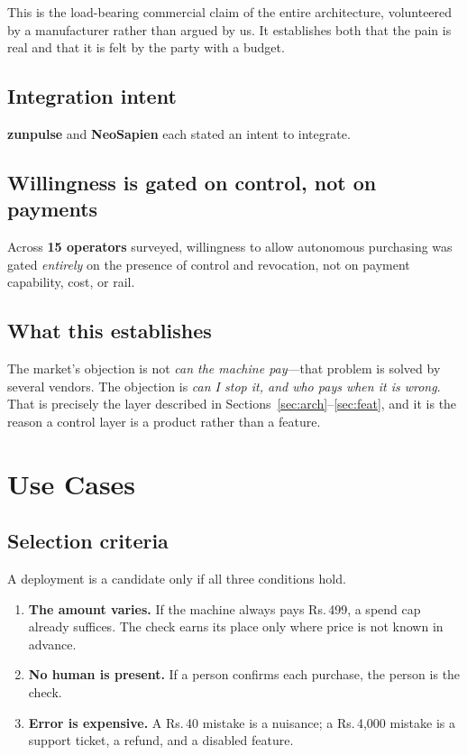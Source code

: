 \documentclass[journal,onecolumn,11pt]{IEEEtran}
\newcommand{\rs}{Rs.\,}
\begin{document}
This is the load-bearing commercial claim of the entire architecture, volunteered by a
manufacturer rather than argued by us. It establishes both that the pain is real and
that it is felt by the party with a budget.

\subsection{Integration intent}
\textbf{zunpulse} and \textbf{NeoSapien} each stated an intent to integrate.

\subsection{Willingness is gated on control, not on payments}
Across \textbf{15 operators} surveyed, willingness to allow autonomous purchasing was
gated \emph{entirely} on the presence of control and revocation, not on payment
capability, cost, or rail.

\subsection{What this establishes}
The market's objection is not \emph{can the machine pay}---that problem is solved by
several vendors. The objection is \emph{can I stop it, and who pays when it is wrong}.
That is precisely the layer described in Sections~\ref{sec:arch}--\ref{sec:feat}, and
it is the reason a control layer is a product rather than a feature.

\section{Use Cases}\label{sec:use}

\subsection{Selection criteria}
A deployment is a candidate only if all three conditions hold.

\begin{enumerate}[leftmargin=*]
\item \textbf{The amount varies.} If the machine always pays \rs 499, a spend cap
already suffices. The check earns its place only where price is not known in advance.
\item \textbf{No human is present.} If a person confirms each purchase, the person is
the check.
\item \textbf{Error is expensive.} A \rs 40 mistake is a nuisance; a \rs 4{,}000
mistake is a support ticket, a refund, and a disabled feature.
\end{enumerate}
\end{document}
